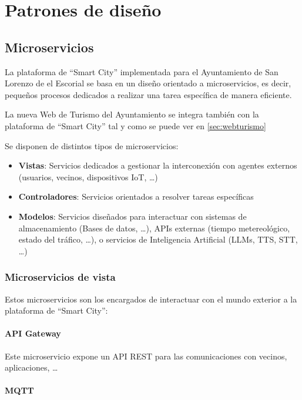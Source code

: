 \section{Patrones de diseño}\label{sec:patrones}
\subsection{Microservicios}\label{sec:microservicios}

La plataforma de ``Smart City'' implementada para el Ayuntamiento de San Lorenzo de el Escorial se basa en un diseño orientado a microservicios, es decir, pequeños procesos dedicados a realizar una tarea específica de manera eficiente.

La nueva Web de Turismo del Ayuntamiento se integra también con la plataforma de ``Smart City'' tal y como se puede ver en \ref{sec:webturismo}

Se disponen de distintos tipos de microservicios:

\begin{itemize}
	\item \textbf{Vistas}: Servicios dedicados a gestionar la interconexión con agentes externos (usuarios, vecinos, dispositivos IoT, \ldots)
	\item \textbf{Controladores}: Servicios orientados a resolver tareas específicas
	\item \textbf{Modelos}: Servicios diseñados para interactuar con sistemas de almacenamiento (Bases de datos, \ldots), APIs externas (tiempo metereológico, estado del tráfico, \ldots), o servicios de Inteligencia Artificial (LLMs, TTS, STT, \ldots)
\end{itemize}

\subsubsection{Microservicios de vista}

Estos microservicios son los encargados de interactuar con el mundo exterior a la plataforma de ``Smart City'':

\paragraph{API Gateway}

Este microservicio expone un API REST para las comunicaciones con vecinos, aplicaciones, \ldots

\paragraph{MQTT}

